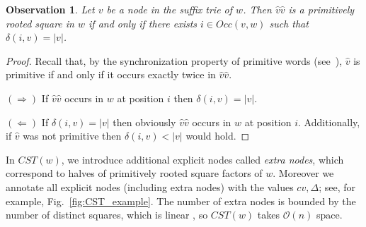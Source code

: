\documentclass{article}
\theoremstyle{theorem}
\newtheorem{observation}{Observation}
\theoremstyle{definition}
\newcommand{\CST}{\mathit{CST}}
\newcommand{\Occ}{\mathit{Occ}}
\renewcommand{\c}{\mathit{cv}}
\newcommand{\Oh}{\mathcal{O}}
\begin{document}
  \begin{observation}\label{obs:primitively_rooted_square}
    Let $v$ be a node in the suffix trie of $w$.
    Then $\hat{v}\hat{v}$ is a primitively rooted square in $w$
    if and only if there exists $i \in \Occ(v,w)$ such that $\delta(i,v)=|v|$.
  \end{observation}
  \begin{proof}
    Recall that, by the synchronization property of primitive words (see~\cite{AlgorithmsOnStrings}),
    $\hat{v}$ is primitive if and only if it occurs exactly twice in $\hat{v}\hat{v}$.

    $(\Rightarrow)$
    If $\hat{v}\hat{v}$ occurs in $w$ at position $i$ then $\delta(i,v)=|v|$.

    $(\Leftarrow)$ If $\delta(i,v)=|v|$ then obviously $\hat{v}\hat{v}$ occurs in $w$ at position $i$.
    Additionally, if $\hat{v}$ was not primitive then $\delta(i,v)<|v|$ would hold.
  \end{proof}

  In $\CST(w)$, we introduce additional explicit nodes called \emph{extra nodes}, 
  which correspond to halves of primitively rooted square factors of $w$.
  Moreover we annotate all explicit nodes (including extra nodes) with the values
  $\c,\Delta$; see, for example, Fig.~\ref{fig:CST_example}.
  The number of extra nodes is bounded by the number of distinct squares, which is linear \cite{DBLP:journals/jct/FraenkelS98},
  so $\CST(w)$ takes $\Oh(n)$ space.
 
\end{document}
